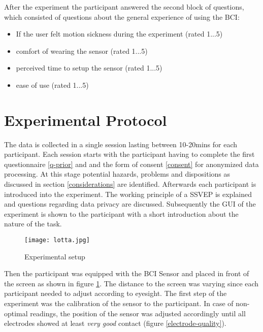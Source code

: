             After the experiment the participant answered the second block of questions, which consisted of questions about the general experience of using the BCI:
            
            \begin{itemize}
                \item If the user felt motion sickness during the experiment (rated 1...5)
                \item comfort of wearing the sensor (rated 1...5)
                \item perceived time to setup the sensor (rated 1...5)
                \item ease of use (rated 1...5) %
            \end{itemize}           

        \section{Experimental Protocol}\label{experimental-protocol}

            The data is collected in a single session lasting between 10-20mins for each participant. Each session starts with the participant having to complete the first questionnaire \ref*{q-prior} and and the form of consent \ref*{consent} for anonymized data processing. At this stage potential hazards, problems and dispositions as discussed in section \ref{considerations} are identified.
            Afterwards each participant is introduced into the experiment. The working principle of a SSVEP is explained and questions regarding data privacy are discussed. Subsequently the GUI of the experiment is shown to the participant with a short introduction about the nature of the task.

            \begin{figure}[h]     %
                \centering
                \texttt{[image: lotta.jpg]} 
                \caption{Experimental setup}\label{experimental-setup}
            \end{figure}            

            Then the participant was equipped with the BCI Sensor and placed in front of the screen as shown in figure \ref*{experimental-setup}. The distance to the screen was varying since each participant needed to adjust according to eyesight. The first step of the experiment was the calibration of the sensor to the participant. In case of non-optimal readings, the position of the sensor was adjusted accordingly until all electrodes showed at least \textit{very good} contact (figure \ref*{electrode-quality}).

